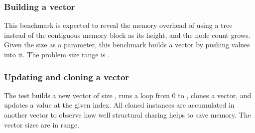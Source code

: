 \subsubsection*{Building a vector}
This benchmark is expected to reveal the memory overhead of using a tree instead of the contiguous memory block as its height, and the node count grows. Given the size \n{} as a parameter, this benchmark builds a vector by pushing \n{} values into it. The problem size range is \range{[20, 60k]}.

\subsubsection*{Updating and cloning a vector}
The test builds a new vector of size \n{}, runs a loop from 0 to \n{}, clones a vector, and updates a value at the given index. All cloned instances are accumulated in another vector to observe how well structural sharing helps to save memory. The vector sizes are in \range{[20, 60k]} range.

